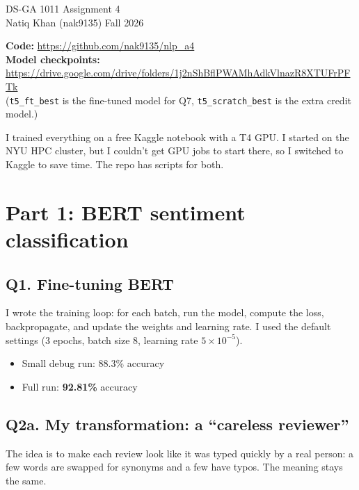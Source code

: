 \documentclass[11pt]{article}
\newcommand{\code}[1]{\texttt{#1}}
\begin{document}
\begin{center}
{\Large DS-GA 1011 Assignment 4}\\[4pt]
Natiq Khan (nak9135) \quad Fall 2026
\end{center}

\textbf{Code:} \url{https://github.com/nak9135/nlp_a4}\\
\textbf{Model checkpoints:}\\ \url{https://drive.google.com/drive/folders/1j2nShBflPWAMhAdkVlnazR8XTUFrPFTk}\\
(\code{t5\_ft\_best} is the fine-tuned model for Q7, \code{t5\_scratch\_best} is the extra credit model.)

I trained everything on a free Kaggle notebook with a T4 GPU. I started on the NYU HPC cluster, but
I couldn't get GPU jobs to start there, so I switched to Kaggle to save time. The repo has scripts
for both.

\section*{Part 1: BERT sentiment classification}

\subsection*{Q1. Fine-tuning BERT}

I wrote the training loop: for each batch, run the model, compute the loss, backpropagate, and
update the weights and learning rate. I used the default settings (3 epochs, batch size 8,
learning rate $5\times10^{-5}$).

\begin{itemize}
  \item Small debug run: 88.3\% accuracy
  \item Full run: \textbf{92.81\%} accuracy
\end{itemize}

\subsection*{Q2a. My transformation: a ``careless reviewer''}

The idea is to make each review look like it was typed quickly by a real person: a few words are
swapped for synonyms and a few have typos. The meaning stays the same.
\end{document}
